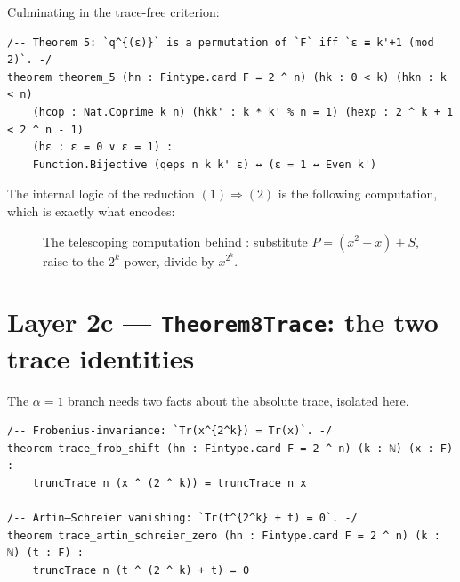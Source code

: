 \documentclass[11pt]{article}
\theoremstyle{definition}
\begin{document}
Culminating in the trace-free criterion:

\begin{lstlisting}
/-- Theorem 5: `q^{(ε)}` is a permutation of `F` iff `ε ≡ k'+1 (mod 2)`. -/
theorem theorem_5 (hn : Fintype.card F = 2 ^ n) (hk : 0 < k) (hkn : k < n)
    (hcop : Nat.Coprime k n) (hkk' : k * k' % n = 1) (hexp : 2 ^ k + 1 < 2 ^ n - 1)
    (hε : ε = 0 ∨ ε = 1) :
    Function.Bijective (qeps n k k' ε) ↔ (ε = 1 ↔ Even k')
\end{lstlisting}

The internal logic of the reduction $(1)\Rightarrow(2)$ is the following
computation, which is exactly what  encodes:

\begin{figure}[h]
\centering
{}
\caption{The telescoping computation behind : substitute
$P=(x^2+x)+S$, raise to the $2^k$ power, divide by $x^{2^k}$.}
\end{figure}

\section{Layer 2c --- \texttt{Theorem8Trace}: the two trace identities}

The $\alpha=1$ branch needs two facts about the absolute trace, isolated here.

\begin{lstlisting}
/-- Frobenius-invariance: `Tr(x^{2^k}) = Tr(x)`. -/
theorem trace_frob_shift (hn : Fintype.card F = 2 ^ n) (k : ℕ) (x : F) :
    truncTrace n (x ^ (2 ^ k)) = truncTrace n x

/-- Artin–Schreier vanishing: `Tr(t^{2^k} + t) = 0`. -/
theorem trace_artin_schreier_zero (hn : Fintype.card F = 2 ^ n) (k : ℕ) (t : F) :
    truncTrace n (t ^ (2 ^ k) + t) = 0
\end{lstlisting}
\end{document}
